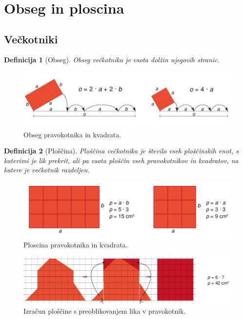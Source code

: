 \documentclass{article}
\newtheorem{definicija}{Definicija}[subsection]
\begin{document}
\pagestyle{empty}

\section{ Obseg in ploscina }
\subsection{ Večkotniki }

\begin{definicija}[Obseg]
    Obseg večkotnika je vsota dolžin njegovih stranic.
\end{definicija}

\begin{figure}[h]
    \includegraphics[width=\linewidth]{obsegPravokotnikInKvadrat.png}
    \centering
    \caption{Obseg pravokotnika in kvadrata.}
\end{figure}

\begin{definicija}[Ploščina]
    Ploščina večkotnika je število vseh ploščinskih enot, s katerimi je lik prekrit, ali pa vsota ploščin vseh pravokotnikov in kvadratov, na katere je večkotnik razdeljen.
\end{definicija}

\begin{figure}[h]
    \includegraphics[width=\linewidth]{ploscinaPravokotnikInKvadrat.png}
    \centering
    \caption{Ploscina pravokotnika in kvadrata.}
\end{figure}
\begin{figure}[h]
    \includegraphics[width=\linewidth]{preoblikovanjeLikaVPravokotnik.png}
    \centering
    \caption{Izračun ploščine s preoblikovanjem lika v pravokotnik.}
\end{figure}
\end{document}
